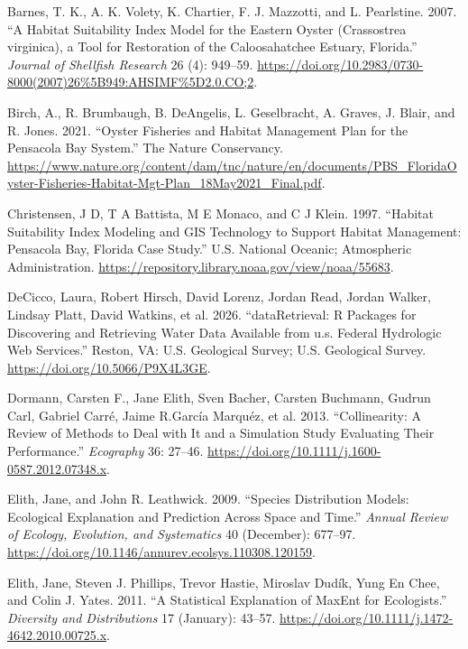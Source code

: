 \documentclass[
  letterpaper,
  DIV=11,
  numbers=noendperiod]{scrartcl}
\newlength{\cslhangindent}
\newenvironment{CSLReferences}[2] %
 {\begin{list}{}{%
  \setlength{\itemindent}{0pt}
  \setlength{\leftmargin}{0pt}
  \setlength{\parsep}{0pt}
  \ifodd #1
   \setlength{\leftmargin}{\cslhangindent}
   \setlength{\itemindent}{-1\cslhangindent}
  \fi
  \setlength{\itemsep}{#2\baselineskip}}}
 {\end{list}}
\begin{document}
\label{refs}
\begin{CSLReferences}{1}{0}
Barnes, T. K., A. K. Volety, K. Chartier, F. J. Mazzotti, and L.
Pearlstine. 2007. {``A Habitat Suitability Index Model for the Eastern
Oyster ({Crassostrea virginica}), a Tool for Restoration of the
Caloosahatchee Estuary, Florida.''} \emph{Journal of Shellfish Research}
26 (4): 949--59.
\url{https://doi.org/10.2983/0730-8000(2007)26\%5B949:AHSIMF\%5D2.0.CO;2}.

Birch, A., R. Brumbaugh, B. DeAngelis, L. Geselbracht, A. Graves, J.
Blair, and R. Jones. 2021. {``Oyster Fisheries and Habitat Management
Plan for the Pensacola Bay System.''} The Nature Conservancy.
\url{https://www.nature.org/content/dam/tnc/nature/en/documents/PBS_FloridaOyster-Fisheries-Habitat-Mgt-Plan_18May2021_Final.pdf}.

Christensen, J D, T A Battista, M E Monaco, and C J Klein. 1997.
{``Habitat Suitability Index Modeling and GIS Technology to Support
Habitat Management: Pensacola Bay, Florida Case Study.''} U.S. National
Oceanic; Atmospheric Administration.
\url{https://repository.library.noaa.gov/view/noaa/55683}.

DeCicco, Laura, Robert Hirsch, David Lorenz, Jordan Read, Jordan Walker,
Lindsay Platt, David Watkins, et al. 2026. {``dataRetrieval: R Packages
for Discovering and Retrieving Water Data Available from u.s. Federal
Hydrologic Web Services.''} Reston, VA: U.S. Geological Survey; U.S.
Geological Survey. \url{https://doi.org/10.5066/P9X4L3GE}.

Dormann, Carsten F., Jane Elith, Sven Bacher, Carsten Buchmann, Gudrun
Carl, Gabriel Carré, Jaime R.García Marquéz, et al. 2013.
{``Collinearity: A Review of Methods to Deal with It and a Simulation
Study Evaluating Their Performance.''} \emph{Ecography} 36: 27--46.
\url{https://doi.org/10.1111/j.1600-0587.2012.07348.x}.

Elith, Jane, and John R. Leathwick. 2009. {``Species Distribution
Models: Ecological Explanation and Prediction Across Space and Time.''}
\emph{Annual Review of Ecology, Evolution, and Systematics} 40
(December): 677--97.
\url{https://doi.org/10.1146/annurev.ecolsys.110308.120159}.

Elith, Jane, Steven J. Phillips, Trevor Hastie, Miroslav Dudík, Yung En
Chee, and Colin J. Yates. 2011. {``A Statistical Explanation of MaxEnt
for Ecologists.''} \emph{Diversity and Distributions} 17 (January):
43--57. \url{https://doi.org/10.1111/j.1472-4642.2010.00725.x}.


\end{CSLReferences}
\end{document}
